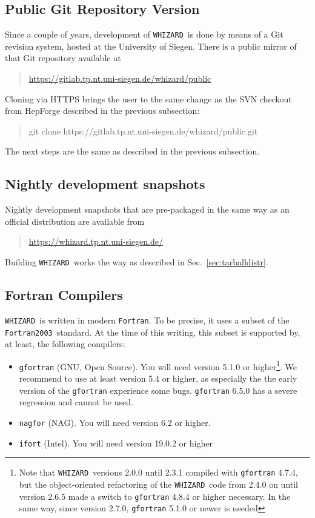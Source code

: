 \documentclass[12pt]{book}
\newcommand{\ttt}[1]{\texttt{#1}}
\newcommand{\whizard}{\ttt{WHIZARD}}
\newcommand{\fortran}{\ttt{Fortran}}
\newcommand{\fortranOThree}{\ttt{Fortran2003}}
\begin{document}

\subsection{Public Git Repository Version}

Since a couple of years, development of \whizard\ is done by means of
a Git revision system, hosted at the University of Siegen. There is a
public mirror of that Git repository available at
\begin{quote}
  \url{https://gitlab.tp.nt.uni-siegen.de/whizard/public}
\end{quote}
Cloning via HTTPS brings the user to the same change as the SVN
checkout from HepForge described in the previous subsection:
\begin{quote}
  git clone https://gitlab.tp.nt.uni-siegen.de/whizard/public.git
\end{quote}
The next steps are the same as described in the previous subsection.


\subsection{Nightly development snapshots}

Nightly development snapshots that are pre-packaged in the same way
as an official distribution are available from
\begin{quote}
  \url{https://whizard.tp.nt.uni-siegen.de/}
\end{quote}
Building \whizard\ works the way as described in
Sec.~\ref{sec:tarballdistr}.



\subsection{\label{sec:compilers}Fortran Compilers}

\whizard\ is written in modern \fortran.  To be precise, it uses a
subset of the \fortranOThree\ standard.  At the time of this writing,
this subset is supported by, at least, the following compilers:
\begin{itemize}
\item
  \ttt{gfortran} (GNU, Open Source).  You will need version 5.1.0
  or higher\footnote{Note that \whizard\ versions 2.0.0 until 2.3.1 compiled
  with \ttt{gfortran} 4.7.4, but the object-oriented
  refactoring of the \whizard\ code from 2.4.0 on until version 2.6.5
  made a switch to \ttt{gfortran} 4.8.4 or higher necessary. In the
  same way, since version 2.7.0, \ttt{gfortran} 5.1.0 or newer is
  needed}. We recommend to use at least version 5.4 or higher, as
  especially the the early version of the \texttt{gfortran} experience
  some bugs. \ttt{gfortran} 6.5.0 has a severe regression and cannot
  be used.
\item
  \ttt{nagfor} (NAG).  You will need version 6.2 or higher.
\item
  \ttt{ifort} (Intel). You will need version 19.0.2 or
  higher
\end{itemize}
\end{document}

